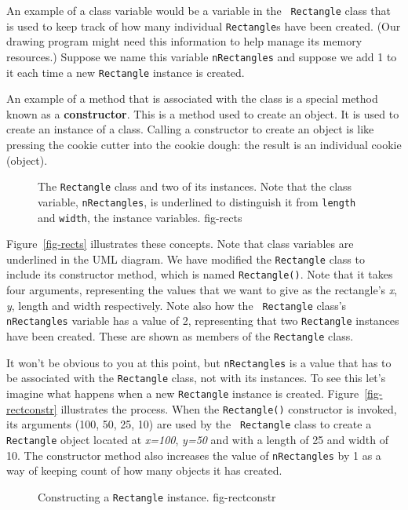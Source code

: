 An example of a class variable would be a variable in the {\tt
Rectangle} class that is used to keep track of how many individual
{\tt Rectangle}s have been created. (Our drawing program might need
this information to help manage its memory resources.)  Suppose we
name this variable {\tt nRectangles} and suppose we add 1 to it each
time a new {\tt Rectangle} instance is created.

An example of a method that is associated with the class is a special
method known as a {\bf constructor}. This is a method used to create
an object. It is used to create an instance of a class. Calling a
constructor to create an object is like pressing the cookie cutter
into the cookie dough: the result is an individual cookie (object).

\begin{figure}[tb]
 {The {\tt Rectangle} class and two of its
instances. Note that the class variable, {\tt nRectangles}, is
underlined to distinguish it from {\tt length} and {\tt width}, the
instance variables.
} {fig-rects}

\end{figure}

Figure~\ref{fig-rects} illustrates these concepts. Note that class
variables are underlined in the UML diagram.  We have modified the
{\tt Rectangle} class to include its constructor method, which is
named {\tt Rectangle()}. Note that it takes four arguments,
representing the values that we want to give as the rectangle's {\it
x}, {\it y}, length and width respectively.  Note also how the {\tt
Rectangle} class's {\tt nRectangles} variable has a value of 2,
representing that two {\tt Rectangle} instances have been created.
These are shown as members of the {\tt Rectangle} class.

It won't be obvious to you at this point, but {\tt nRectangles} is a
value that has to be associated with the {\tt Rectangle} class, not
with its instances.  To see this let's imagine what happens when a new
{\tt Rectangle} instance is created. Figure~\ref{fig-rectconstr}
illustrates the process.  When the {\tt Rectangle()} constructor is
invoked, its arguments (100, 50, 25, 10) are used by the {\tt
Rectangle} class to create a {\tt Rectangle} object located at {\it
x=100}, {\it y=50} and with a length of 25 and width of 10. The
constructor method also increases the value of {\tt nRectangles} by 1
as a way of keeping count of how many objects it has created.

\begin{figure}[h]
{Constructing a {\tt Rectangle} instance.
} {fig-rectconstr}

\end{figure}

